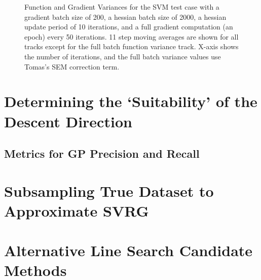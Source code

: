 \documentclass{article}
\begin{document}
\begin{figure}[h!]
\centering
{}
\caption{Function and Gradient Variances for the SVM test case with a gradient batch size of 200, a hessian batch size of 2000, a hessian update period of 10 iterations, and a full gradient computation (an epoch) every 50 iterations. 11 step moving averages are shown for all tracks except for the full batch function variance track. X-axis shows the number of iterations, and the full batch variance values use Tomas's SEM correction term.}
\end{figure}

\section{Determining the `Suitability' of the Descent Direction}
\subsection{Metrics for GP Precision and Recall}
\section{Subsampling True Dataset to Approximate SVRG}
\section{Alternative Line Search Candidate Methods}
\end{document}
